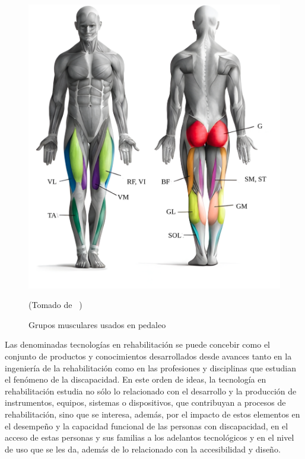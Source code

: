 \begin{figure}[ht]
    \centering
    \includegraphics[scale=0.2]{images/musculegroups.png}
    \caption{Grupos musculares usados en pedaleo}
    (Tomado de ~\cite{Quémúsc72})
    \label{fig: musculegroups}
\end{figure}

\vspace{10pt}
Las denominadas tecnologías en rehabilitación se puede concebir como el conjunto de productos y conocimientos
desarrollados desde avances tanto en la ingeniería de la rehabilitación como en las profesiones y disciplinas 
que estudian el fenómeno de la discapacidad. En este orden de ideas, la tecnología en rehabilitación estudia 
no sólo lo relacionado con el desarrollo y la producción de instrumentos, equipos, sistemas o dispositivos, 
que contribuyan a procesos de rehabilitación, sino que se interesa, además, por el impacto de estos elementos en el desempeño y la capacidad funcional de las personas con discapacidad, en el acceso
de estas personas y sus familias a los adelantos tecnológicos y en el nivel de uso que se les da,
además de lo relacionado con la accesibilidad y diseño.\cite{matheus1990tecnologia}

